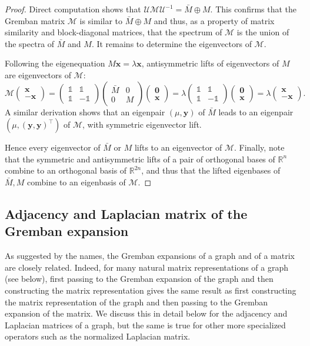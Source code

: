 \documentclass[reprint,onecolumn]{article}
\newcommand{\mc}[1]{\mathcal{#1}}
\newcommand{\R}{\mathbb{R}}
\newcommand{\1}{\mathbb{1}}
\newcommand{\x}{\mathbf{x}}
\newcommand{\0}{\mathbf{0}}
\begin{document}
\begin{proof}
Direct computation shows that $\mathcal{U}\mathcal{M}\mathcal{U}^{-1}= \bar{M}\oplus M$. This confirms that the Gremban matrix $\mathcal{M}$ is similar to $\bar{M}\oplus M$ and thus, as a property of matrix similarity and block-diagonal matrices, that the spectrum of $\mc M$ is the union of the spectra of $\bar{M}$ and $M$. It remains to determine the eigenvectors of $\mathcal{M}$.

Following the eigenequation $M\mathbf{x}=\lambda\mathbf{x}$, antisymmetric lifts of eigenvectors of $M$ are eigenvectors of $\mathcal{M}$:
\[
\mc M\begin{pmatrix}\x\\-\x\end{pmatrix} = 
\begin{pmatrix}
    \1 & \1 \\ \1 & -\1 
\end{pmatrix} \begin{pmatrix}\bar M & 0\\0 & M\end{pmatrix} \begin{pmatrix}\0\\ \x\end{pmatrix} = 
\lambda \begin{pmatrix}
    \1 & \1 \\ \1 & -\1 
\end{pmatrix} \begin{pmatrix} \0\\ \x\end{pmatrix} = \lambda  \begin{pmatrix}\x\\ -\x\end{pmatrix}.
\]
A similar derivation shows that an eigenpair $(\mu,\mathbf{y})$ of $\bar{M}$ leads to an eigenpair $(\mu,(\mathbf{y},\mathbf{y})^\top)$ of $\mathcal{M}$, with symmetric eigenvector lift.

Hence every eigenvector of $\bar{M}$ or $M$ lifts to an eigenvector of $\mc M$. Finally, note that the symmetric and antisymmetric lifts of a pair of orthogonal bases of $\R^n$ combine to an orthogonal basis of $\R^{2n}$, and thus that the lifted eigenbases of $\bar{M},M$ combine to an eigenbasis of $\mathcal{M}$.
\end{proof}
%

\subsection{Adjacency and Laplacian matrix of the Gremban expansion}
As suggested by the names, the Gremban expansions of a graph and of a matrix are closely related. Indeed, for many natural matrix representations of a graph (see below), first passing to the Gremban expansion of the graph and then constructing the matrix representation gives the same result as first constructing the matrix representation of the graph and then passing to the Gremban expansion of the matrix. We discuss this in detail below for the adjacency and Laplacian matrices of a graph, but the same is true for other more specialized operators such as the normalized Laplacian matrix.
%
\end{document}
